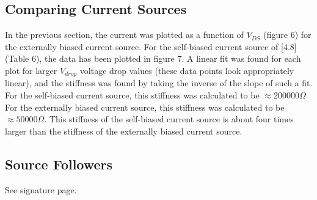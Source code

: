 \documentclass{article}
\begin{document}
\subsection{Comparing Current Sources}
    In the previous section, the current was plotted as a function of $V_{DS}$ (figure 6) for the externally biased current source. For the self-biased current source of [4.8] (Table 6), the data has been plotted in figure 7. A linear fit was found for each plot for larger $V_{drop}$ voltage drop values (these data points look appropriately linear), and the stiffness was found by taking the inverse of the slope of such a fit.\\\indent For the self-biased current source, this stiffness was calculated to be $\approx  200000\Omega$  \\\indent For the externally biased current source, this stiffness was calculated to be $\approx 50000\Omega$. This stiffness of the self-biased current source is about four times larger than the stiffness of the externally biased current source. 
    
\subsection{Source Followers}
    See signature page.
    
\end{document}

